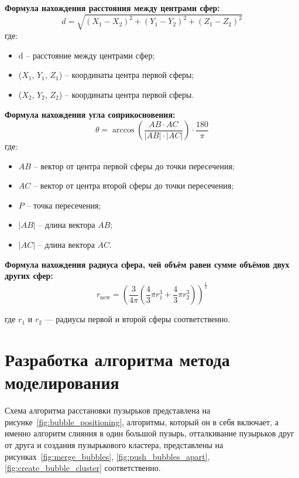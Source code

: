 \textbf{Формула нахождения расстояния между центрами сфер:}
\begin{equation} \label{eq:distance}
	d = \sqrt{(X_1 - X_2)^2 + (Y_1 - Y_2)^2 + (Z_1 - Z_2)^2}
\end{equation}
где: 
\begin{itemize}	
	\item d -- расстояние между центрами сфер;
	\item ($X_1$, $Y_1$, $Z_1$) -- координаты центра первой сферы;
	\item ($X_2$, $Y_2$, $Z_2$) -- координаты центра первой сферы.
\end{itemize}

\textbf{Формула нахождения угла соприкосновения:}
\begin{equation} \label{eq:angle}
	\theta = \arccos\left(\frac{AB \cdot AC}{|AB| \cdot |AC|}\right) \cdot \frac{180}{\pi}
\end{equation}
где:
\begin{itemize}	
	\item $AB$ -- вектор от центра первой сферы до точки пересечения;
	\item $AC$ -- вектор от центра второй сферы до точки пересечения;
	\item $P$ -- точка пересечения;
	\item $|AB|$ -- длина вектора $AB$;
	\item $|AC|$ -- длина вектора $AC$.
\end{itemize}

\textbf{Формула нахождения радиуса сфера, чей объём равен сумме объёмов двух других сфер:}
\begin{equation}
	r_{\text{new}} = \left( \frac{3}{4\pi} \left( \frac{4}{3} \pi r_1^3 + \frac{4}{3} \pi r_2^3 \right) \right)^{\frac{1}{3}}
\end{equation}

где $r_1$ и $r_2$ — радиусы первой и второй сферы соответственно.

\section{Разработка алгоритма метода моделирования}

Схема алгоритма расстановки пузырьков представлена на рисунке~\ref{fig:bubble_positioning}, алгоритмы, который он в себя включает, а именно алгоритм слияния в один большой пузырь, отталкивание пузырьков друг от друга и создания пузырькового кластера, представлены на рисунках~\ref{fig:merge_bubbles}, \ref{fig:push_bubbles_apart}, \ref{fig:create_bubble_cluster} соответственно.

